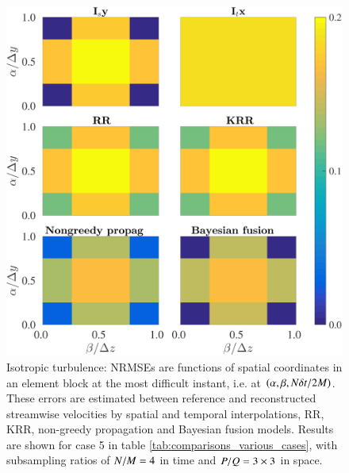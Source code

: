 \begin{figure}[h]
\begin{center}
\includegraphics[width = 0.8\columnwidth]{./images/comparisons/isotropic/compare_boxin4HWs_sspacing3_tspacing4.png}
\caption{\label{fig:final_isotropic_error_boxes_case5} Isotropic turbulence: NRMSEs are functions of spatial coordinates in an element block at the most difficult instant, i.e. at $ (\alpha,\beta,N \delta t/2M) $. These errors are estimated between reference and reconstructed streamwise velocities by spatial and temporal interpolations, RR, KRR, non-greedy propagation and Bayesian fusion models. Results are shown for case 5 in table \ref{tab:comparisons_various_cases}, with subsampling ratios of $ N/M = 4 $ in time and $ P/Q = 3 \times 3 $ in space.}
\end{center}
\end{figure}

